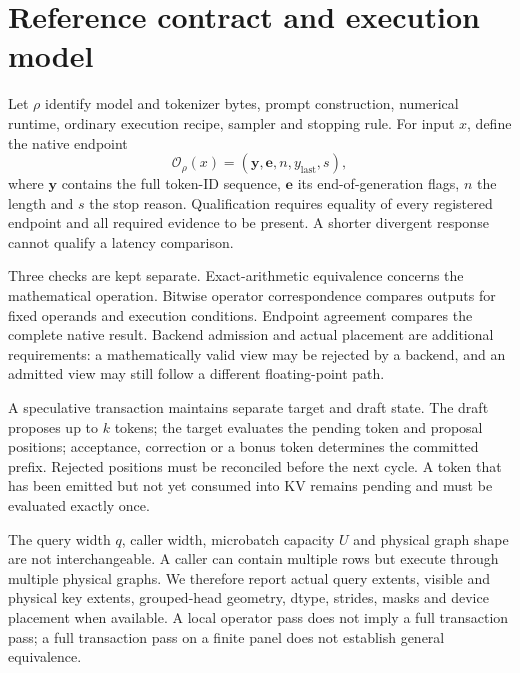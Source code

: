 \section{Reference contract and execution model}
\label{sec:contract}
Let $\rho$ identify model and tokenizer bytes, prompt construction, numerical runtime, ordinary execution recipe, sampler and stopping rule. For input $x$, define the native endpoint
\[
\mathcal{O}_{\rho}(x)=(\mathbf y,\mathbf e,n,y_{\mathrm{last}},s),
\]
where $\mathbf y$ contains the full token-ID sequence, $\mathbf e$ its end-of-generation flags, $n$ the length and $s$ the stop reason. Qualification requires equality of every registered endpoint and all required evidence to be present. A shorter divergent response cannot qualify a latency comparison.

Three checks are kept separate. Exact-arithmetic equivalence concerns the mathematical operation. Bitwise operator correspondence compares outputs for fixed operands and execution conditions. Endpoint agreement compares the complete native result. Backend admission and actual placement are additional requirements: a mathematically valid view may be rejected by a backend, and an admitted view may still follow a different floating-point path.

A speculative transaction maintains separate target and draft state. The draft proposes up to $k$ tokens; the target evaluates the pending token and proposal positions; acceptance, correction or a bonus token determines the committed prefix. Rejected positions must be reconciled before the next cycle. A token that has been emitted but not yet consumed into KV remains pending and must be evaluated exactly once.

The query width $q$, caller width, microbatch capacity $U$ and physical graph shape are not interchangeable. A caller can contain multiple rows but execute through multiple physical graphs. We therefore report actual query extents, visible and physical key extents, grouped-head geometry, dtype, strides, masks and device placement when available. A local operator pass does not imply a full transaction pass; a full transaction pass on a finite panel does not establish general equivalence.

